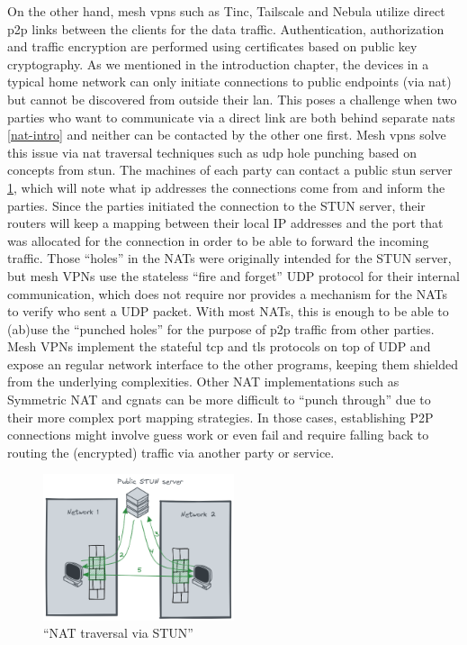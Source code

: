On the other hand, mesh \glspl{vpn} such as Tinc\autocite{tincDocs},
Tailscale\autocite{tailscaleDocs} and Nebula\autocite{nebulaDocs}
utilize direct \gls{p2p} links between the clients for the data traffic.
Authentication, authorization and traffic encryption are performed using
certificates based on public key cryptography. As we mentioned in the
introduction chapter, the devices in a typical home network can only
initiate connections to public endpoints (via \gls{nat}) but cannot be
discovered from outside their \gls{lan}. This poses a challenge when two
parties who want to communicate via a direct link are both behind
separate \glspl{nat} \ref{nat-intro} and neither can be contacted by the
other one first. Mesh \glspl{vpn} solve this issue via \gls{nat}
traversal techniques such as \gls{udp} hole punching based on concepts
from \gls{stun}. The machines of each party can contact a public
\gls{stun} server \ref{nat-traversal}, which will note what \gls{ip}
addresses the connections come from and inform the parties. Since the
parties initiated the connection to the STUN server, their routers will
keep a mapping between their local IP addresses and the port that was
allocated for the connection in order to be able to forward the incoming
traffic. Those ``holes'' in the NATs were originally intended for the
STUN server, but mesh VPNs use the stateless ``fire and forget'' UDP
protocol for their internal communication, which does not require nor
provides a mechanism for the NATs to verify who sent a UDP packet. With
most NATs, this is enough to be able to (ab)use the ``punched holes''
for the purpose of \gls{p2p} traffic from other parties. Mesh VPNs
implement the stateful \gls{tcp} and \gls{tls} protocols on top of UDP
and expose an regular network interface to the other programs, keeping
them shielded from the underlying complexities. Other NAT
implementations such as Symmetric NAT and \glspl{cgnat} can be more
difficult to ``punch through'' due to their more complex port mapping
strategies. In those cases, establishing P2P connections might involve
guess work or even fail and require falling back to routing the
(encrypted) traffic via another party or service.

\begin{figure}
\centering
\includegraphics[width=0.5\textwidth,height=0.25\textheight]{prep/../figures/nat-traversal.png}
\caption{``NAT traversal via STUN''\label{nat-traversal}}
\end{figure}

